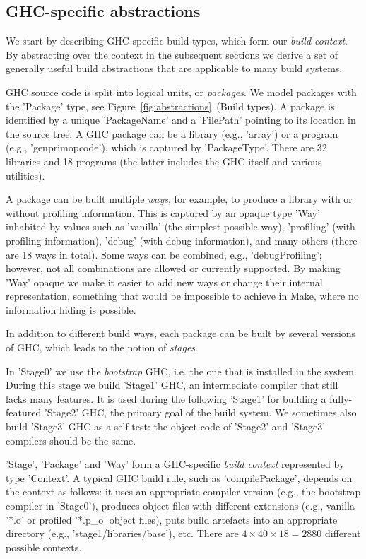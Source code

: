 \subsection{GHC-specific abstractions}

We start by describing GHC-specific build types, which form our \emph{build
context}. By abstracting over the context in the subsequent sections we derive a
set of generally useful build abstractions that are applicable to many build
systems.

GHC source code is split into logical units, or \emph{packages}. We model
packages with the \lst'Package' type, see
Figure~\ref{fig:abstractions}~(Build types). A package is identified by a
unique \lst'PackageName' and a \lst'FilePath' pointing to its location in the
source tree. A GHC package can be a library (e.g., \lst'array') or a program
(e.g., \lst'genprimopcode'), which is captured by \lst'PackageType'. There are
32 libraries and 18 programs (the latter includes the GHC itself and various utilities).

A package can be built multiple \emph{ways}, for example, to produce a library
with or without profiling information. This is captured by an opaque
type \lst'Way' inhabited by values such as \lst'vanilla' (the simplest
possible way), \lst'profiling' (with profiling information), \lst'debug'
(with debug information), and many others (there are 18 ways in total). Some
ways can be combined, e.g., \lst'debugProfiling'; however, not all combinations
are allowed or currently supported. By making \lst'Way' opaque we make it easier
to add new ways or change their internal representation, something that would be
impossible to achieve in Make, where no information hiding is possible. 

In addition to different build ways, each package can be built by several
versions of GHC, which leads to the notion of \emph{stages}.

In \lst'Stage0' we use the \emph{bootstrap} GHC, i.e. the one that is
installed in the system. During this stage we build \lst'Stage1' GHC, an
intermediate compiler that still lacks many features. It is used during the
following \lst'Stage1' for building a fully-featured \lst'Stage2' GHC, the
primary goal of the build system. We sometimes also build \lst'Stage3' GHC as
a self-test: the object code of \lst'Stage2' and \lst'Stage3' compilers
should be the same.

\lst'Stage', \lst'Package' and \lst'Way' form a GHC-specific
\emph{build context} represented by type \lst'Context'. A typical GHC build
rule, such as \lst'compilePackage', depends on the context as follows: it
uses an appropriate compiler version (e.g., the bootstrap compiler in
\lst'Stage0'), produces object files with different extensions (e.g., vanilla
\lst'*.o' or profiled \lst'*.p_o' object files), puts build artefacts
into an appropriate directory (e.g., \lst'stage1/libraries/base'), etc.
There are $4 \times 40 \times 18 = 2880$ different possible contexts.

